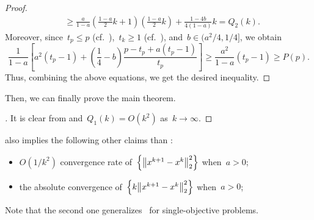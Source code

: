 \documentclass[../main]{subfiles}
\begin{document}
\begin{proof}
\begin{align}
                     & \ge \frac{a}{1 - a} \left( \frac{1 - a}{2} k + 1 \right) \left( \frac{1 - a}{2} k \right) + \frac{1 - 4 b}{4 (1 - a)} k = Q_2(k)
                    .\end{align}
                Moreover, since~$t_p \le p$ (cf.~),~$t_k \ge 1$ (cf.~), and~$b \in (a^2 / 4, 1 / 4]$, we obtain
    \begin{equation}
        \frac{1}{1 - a} \left[ a^2 (t_p - 1) + \left( \frac{1}{4} - b \right) \frac{p - t_p + a (t_p - 1)}{t_p} \right] \ge \frac{a^2}{1 - a} (t_p - 1) \ge P(p)
        .\end{equation}
    Thus, combining the above equations, we get the desired inequality.
\end{proof}

Then, we can finally prove the main theorem.
\begin{proof}[]
    It is clear from  and~$Q_1(k) = O(k^2)$ as~$k \to \infty$.
\end{proof}
\begin{remark}
     also implies the following other claims than :
    \begin{itemize}
        \item $O(1 / k^2)$ convergence rate of~$\set*{\norm*{x^{k + 1} - x^k}_2^2}$ when~$a > 0$;
        \item the absolute convergence of~$\set*{k \norm*{x^{k + 1} - x^k}_2^2}$ when~$a > 0$;
    \end{itemize}
    Note that the second one generalizes~\cite[Corollary~3.2]{Chambolle2015} for single-objective problems.
\end{remark}
\end{document}
